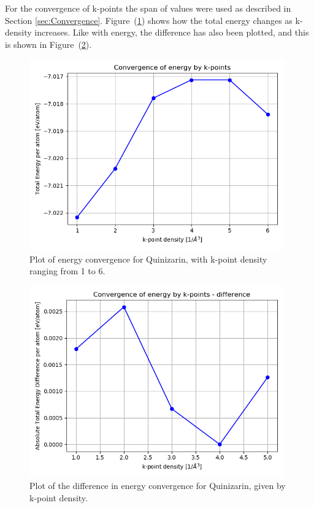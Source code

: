 \documentclass{article}
\begin{document}
    For the convergence of k-points the span of values were used as described in Section \ref{sec:Convergence}. Figure~(\ref{fig:convergence_kpoints}) shows how the total energy changes as k-density increases. Like with energy, the difference has also been plotted, and this is shown in Figure~(\ref{fig:convergence_kpoints_difference}).

    \begin{figure}[H]
        \centering
        \includegraphics[width = 11cm]{../fig/convergence_kpoints.png}
        \caption{Plot of energy convergence for Quinizarin, with k-point density ranging from 1 to 6. }
        \label{fig:convergence_kpoints}
    \end{figure}

    \begin{figure}[H]
        \centering
        \includegraphics[width = 11cm]{../fig/convergence_kpoints_difference.png}
        \caption{Plot of the difference in energy convergence for Quinizarin, given by k-point density. }
        \label{fig:convergence_kpoints_difference}
    \end{figure}
\end{document}
